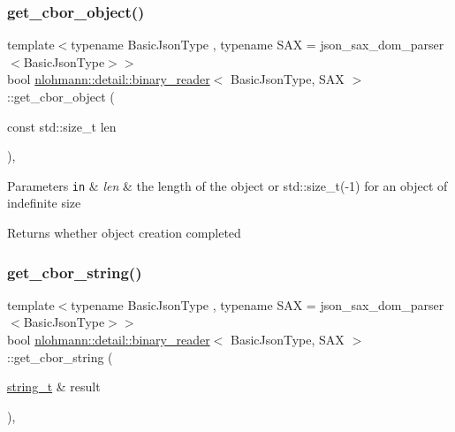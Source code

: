 \subsubsection{\texorpdfstring{get\+\_\+cbor\+\_\+object()}{get\_cbor\_object()}}
{\footnotesize\ttfamily template$<$typename Basic\+Json\+Type , typename S\+AX  = json\+\_\+sax\+\_\+dom\+\_\+parser$<$\+Basic\+Json\+Type$>$$>$ \\
bool \hyperlink{classnlohmann_1_1detail_1_1binary__reader}{nlohmann\+::detail\+::binary\+\_\+reader}$<$ Basic\+Json\+Type, S\+AX $>$\+::get\+\_\+cbor\+\_\+object (\begin{DoxyParamCaption}\item[{const std\+::size\+\_\+t}]{len }\end{DoxyParamCaption})\hspace{0.3cm}{\ttfamily [inline]}, {\ttfamily [private]}}


\begin{DoxyParams}[1]{Parameters}
\mbox{\tt in}  & {\em len} & the length of the object or std\+::size\+\_\+t(-\/1) for an object of indefinite size \\
\hline
\end{DoxyParams}
\begin{DoxyReturn}{Returns}
whether object creation completed 
\end{DoxyReturn}
\mbox{\label{classnlohmann_1_1detail_1_1binary__reader_acca76844160000e1d8215cb5c7afbba1}} 
\subsubsection{\texorpdfstring{get\+\_\+cbor\+\_\+string()}{get\_cbor\_string()}}
{\footnotesize\ttfamily template$<$typename Basic\+Json\+Type , typename S\+AX  = json\+\_\+sax\+\_\+dom\+\_\+parser$<$\+Basic\+Json\+Type$>$$>$ \\
bool \hyperlink{classnlohmann_1_1detail_1_1binary__reader}{nlohmann\+::detail\+::binary\+\_\+reader}$<$ Basic\+Json\+Type, S\+AX $>$\+::get\+\_\+cbor\+\_\+string (\begin{DoxyParamCaption}\item[{\hyperlink{classnlohmann_1_1detail_1_1binary__reader_aa0b9729917ca7ee6ed01e3792341316e}{string\+\_\+t} \&}]{result }\end{DoxyParamCaption})\hspace{0.3cm}{\ttfamily [inline]}, {\ttfamily [private]}}




